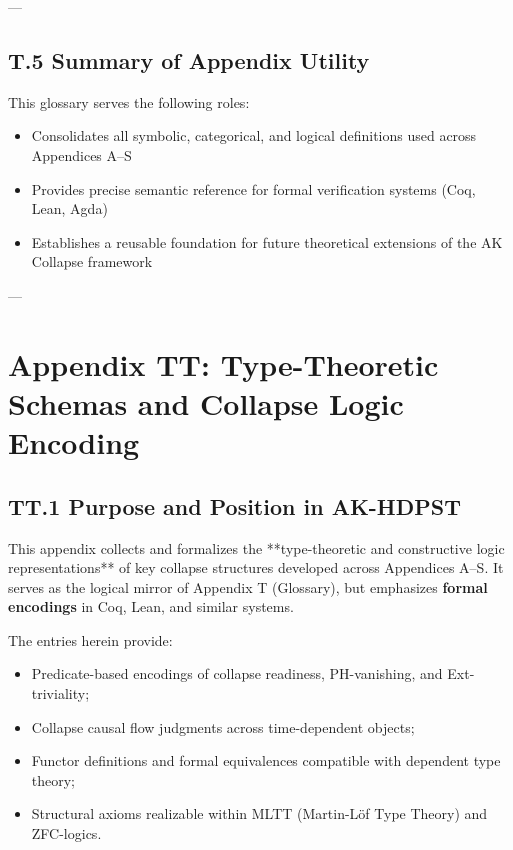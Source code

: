 \documentclass[11pt]{article}
\begin{document}
{---

\subsection*{T.5 Summary of Appendix Utility}

This glossary serves the following roles:

\begin{itemize}
  \item Consolidates all symbolic, categorical, and logical definitions used across Appendices A–S
  \item Provides precise semantic reference for formal verification systems (Coq, Lean, Agda)
  \item Establishes a reusable foundation for future theoretical extensions of the AK Collapse framework
\end{itemize}

---

\section*{Appendix TT: Type-Theoretic Schemas and Collapse Logic Encoding}

\subsection*{TT.1 Purpose and Position in AK-HDPST}

This appendix collects and formalizes the **type-theoretic and constructive logic representations**  
of key collapse structures developed across Appendices A–S. It serves as the logical mirror of Appendix T (Glossary),  
but emphasizes \textbf{formal encodings} in Coq, Lean, and similar systems.

The entries herein provide:

\begin{itemize}
  \item Predicate-based encodings of collapse readiness, PH-vanishing, and Ext-triviality;
  \item Collapse causal flow judgments across time-dependent objects;
  \item Functor definitions and formal equivalences compatible with dependent type theory;
  \item Structural axioms realizable within MLTT (Martin-Löf Type Theory) and ZFC-logics.
\end{itemize}

}
\end{document}
